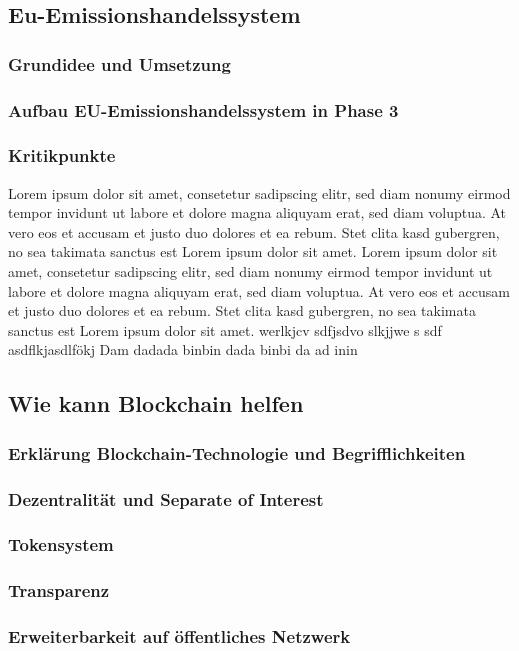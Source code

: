 \documentclass[a4paper, 10pt]{scrartcl}
\begin{document}
\subsection{Eu-Emissionshandelssystem}
\subsubsection{Grundidee und Umsetzung}
\subsubsection{Aufbau EU-Emissionshandelssystem in Phase 3}
\subsubsection{Kritikpunkte}
Lorem ipsum dolor sit amet, consetetur sadipscing elitr, sed diam nonumy eirmod tempor invidunt ut labore et dolore magna aliquyam erat, sed diam voluptua. At vero eos et accusam et justo duo dolores et ea rebum. Stet clita kasd gubergren, no sea takimata sanctus est Lorem ipsum dolor sit amet. Lorem ipsum dolor sit amet, consetetur sadipscing elitr, sed diam nonumy eirmod tempor invidunt ut labore et dolore magna aliquyam erat, sed diam voluptua. At vero eos et accusam et justo duo dolores et ea rebum. Stet clita kasd gubergren, no sea takimata sanctus est Lorem ipsum dolor sit amet.
werlkjcv sdfjsdvo slkjjwe s sdf asdflkjasdlfökj
Dam dadada binbin dada binbi da ad inin 
\subsection{Wie kann Blockchain helfen}
\subsubsection{Erklärung Blockchain-Technologie und Begrifflichkeiten}
\subsubsection{Dezentralität und Separate of Interest}
\subsubsection{Tokensystem}
\subsubsection{Transparenz}
\subsubsection{Erweiterbarkeit auf öffentliches Netzwerk}
\end{document}
